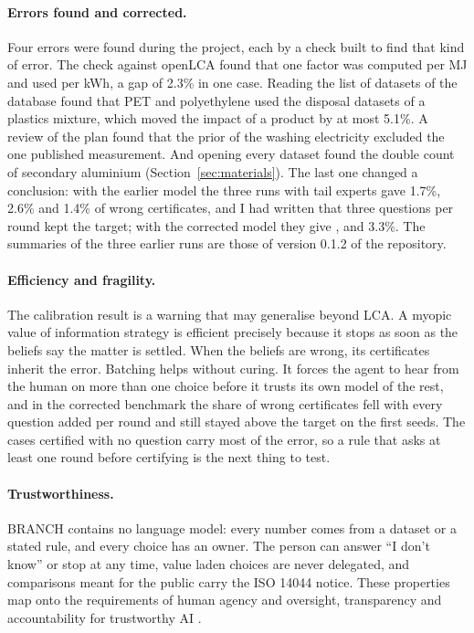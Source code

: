 \documentclass{article}
\begin{document}
\paragraph{Errors found and corrected.}
Four errors were found during the project, each by a check built to find that kind of error. The check
against openLCA found that one factor was computed per MJ and used per kWh, a gap of 2.3\% in one case.
Reading the list of datasets of the database found that PET and polyethylene used the disposal datasets of
a plastics mixture, which moved the impact of a product by at most 5.1\%. A review of the plan found that
the prior of the washing electricity excluded the one published measurement. And opening every dataset
found the double count of secondary aluminium (Section~\ref{sec:materials}). The last one changed a
conclusion: with the earlier model the three runs with tail experts gave 1.7\%, 2.6\% and 1.4\% of wrong
certificates, and I had written that three questions per round kept the target; with the corrected model
they give \wFlipChosenTails{}, \wFlipHoldThree{} and 3.3\%. The summaries of the three earlier runs are
those of version 0.1.2 of the repository.

\paragraph{Efficiency and fragility.}
The calibration result is a warning that may generalise beyond LCA. A myopic value of information
strategy is efficient precisely because it stops as soon as the beliefs say the matter is settled. When the
beliefs are wrong, its certificates inherit the error. Batching helps without curing. It forces the agent to
hear from the human on more than one choice before it trusts its own model of the rest, and in the corrected benchmark the share of wrong certificates fell with every question added per round and still stayed above the target on the first seeds. The cases certified with no question carry most of the error, so a rule that asks at least one round before certifying is the next thing to test.

\paragraph{Trustworthiness.}
BRANCH contains no language model: every number comes from a dataset or a stated rule, and every choice has an owner. The person
can answer ``I don't know'' or stop at any time, value laden choices are never delegated, and comparisons meant for the public
carry the ISO 14044 notice. These properties map onto the requirements of human agency and oversight,
transparency and accountability for trustworthy AI \citep{hleg2019}.
\end{document}
